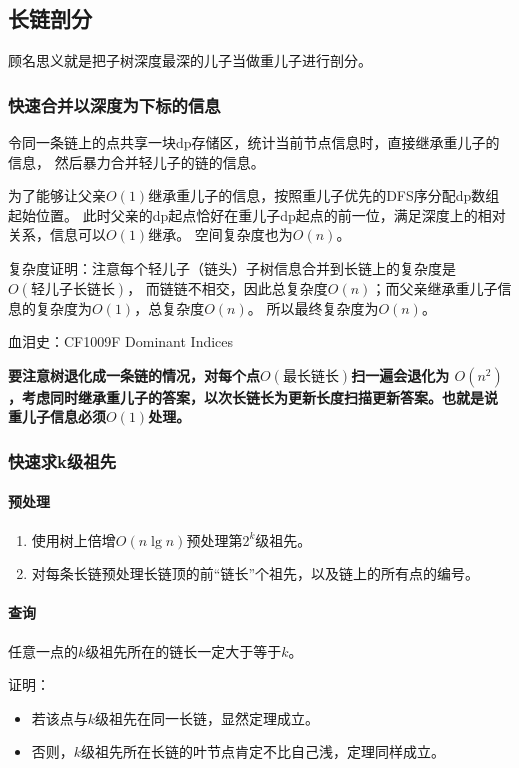 \subsection{长链剖分}

顾名思义就是把子树深度最深的儿子当做重儿子进行剖分。

\subsubsection{快速合并以深度为下标的信息}
令同一条链上的点共享一块dp存储区，统计当前节点信息时，直接继承重儿子的信息，
然后暴力合并轻儿子的链的信息。

为了能够让父亲$O(1)$继承重儿子的信息，按照重儿子优先的DFS序分配dp数组起始位置。
此时父亲的dp起点恰好在重儿子dp起点的前一位，满足深度上的相对关系，信息可以$O(1)$继承。
空间复杂度也为$O(n)$。

复杂度证明：注意每个轻儿子（链头）子树信息合并到长链上的复杂度是$O(\textrm{轻儿子长链长})$，
而链链不相交，因此总复杂度$O(n)$；而父亲继承重儿子信息的复杂度为$O(1)$，总复杂度$O(n)$。
所以最终复杂度为$O(n)$。

血泪史：CF1009F Dominant Indices

	{\bfseries 要注意树退化成一条链的情况，对每个点$O(\textrm{最长链长})$扫一遍会退化为
        $O(n^2)$，考虑同时继承重儿子的答案，以次长链长为更新长度扫描更新答案。也就是说
    重儿子信息必须$O(1)$处理。}



\subsubsection{快速求k级祖先}
\paragraph{预处理}
\begin{enumerate}
	\item 使用树上倍增$O(n\lg n)$预处理第$2^k$级祖先。
	\item 对每条长链预处理长链顶的前``链长''个祖先，以及链上的所有点的编号。
\end{enumerate}

\paragraph{查询}

\begin{theorem}\label{DBCBD}
	任意一点的$k$级祖先所在的链长一定大于等于$k$。
\end{theorem}
证明：
\begin{itemize}
	\item 若该点与$k$级祖先在同一长链，显然定理成立。
	\item 否则，$k$级祖先所在长链的叶节点肯定不比自己浅，定理同样成立。
\end{itemize}

